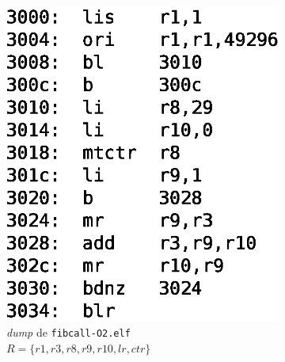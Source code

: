     \begin{figure}[ht]
      \centering
      \begin{subfigure}{.45\textwidth}
        \centering
        \includegraphics[scale=0.45]{img/dump.eps}
        \captionsetup{justification=centering}
        \caption{\emph{dump} de \texttt{fibcall-O2.elf} \\
          $R = \{r1, r3, r8, r9, r10, lr, ctr\}$}
        \label{fig:dump}
      \end{subfigure}
      \begin{subfigure}{.45\textwidth}
        \centering

\end{subfigure}
\end{figure}
